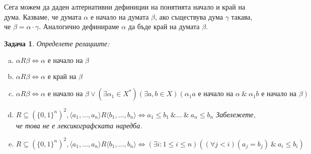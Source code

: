 \documentclass[a4paper]{article}
\newtheorem{problem}{Задача}
\begin{document}
Сега можем да даден алтернативни дефиниции на понятията начало и край на дума.
Казваме, че думата $\alpha$ е начало на думата $\beta$, ако съществува дума $\gamma$ такава, че
$\beta = \alpha\cdot\gamma$.
Аналогично дефинираме $\alpha$ да бъде край на думата $\beta$.


\begin{problem}
  Определете релациите:
  \begin{enumerate}[a)]
  \item
    $\alpha R \beta \iff \alpha \mbox{ е начало на }\beta$ 
  \item
    $\alpha R \beta \iff \alpha \mbox{ е край на }\beta$
  \item
    $\alpha R \beta \iff \alpha \mbox{ е начало на }\beta \vee (\exists\alpha_1\in X^{*})(\exists a,b\in X)(\alpha_1 a \mbox{ е начало на }\alpha\ \&\ \alpha_1 b \mbox{ е начало на } \beta)$
  \item
    $R\subseteq (\{0,1\}^{n})^{2}, \langle{a_1,\dots,a_n}\rangle R \langle{b_1,\dots,b_n}\rangle \iff a_1\leq b_1\ \&\dots\ \&\ a_n\leq b_n$
    Забележете, че това не е лексикографската наредба.
  \item
    $R\subseteq (\{0,1\}^{n})^{2}, \langle{a_1,\dots,a_n}\rangle R \langle{b_1,\dots,b_n}\rangle \iff (\exists i : 1\leq i\leq n)((\forall j < i)(a_j = b_j)\ \&\ a_i \leq b_i)$
\end{enumerate}
\end{problem}
\end{document}
